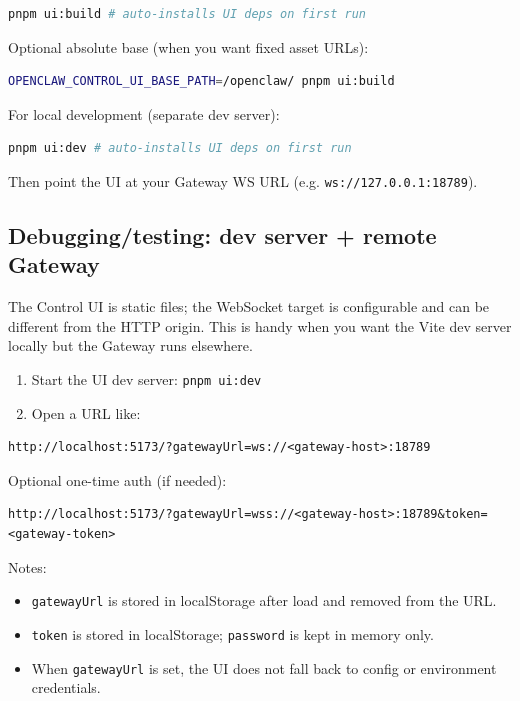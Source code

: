\begin{lstlisting}[language=bash]
pnpm ui:build # auto-installs UI deps on first run
\end{lstlisting}


Optional absolute base (when you want fixed asset URLs):

\begin{lstlisting}[language=bash]
OPENCLAW_CONTROL_UI_BASE_PATH=/openclaw/ pnpm ui:build
\end{lstlisting}


For local development (separate dev server):

\begin{lstlisting}[language=bash]
pnpm ui:dev # auto-installs UI deps on first run
\end{lstlisting}


Then point the UI at your Gateway WS URL (e.g. \texttt{ws://127.0.0.1:18789}).

\subsection{Debugging/testing: dev server + remote Gateway}


The Control UI is static files; the WebSocket target is configurable and can be
different from the HTTP origin. This is handy when you want the Vite dev server
locally but the Gateway runs elsewhere.

\begin{enumerate}
  \item Start the UI dev server: \texttt{pnpm ui:dev}
  \item Open a URL like:
\end{enumerate}


\begin{lstlisting}
http://localhost:5173/?gatewayUrl=ws://<gateway-host>:18789
\end{lstlisting}


Optional one-time auth (if needed):

\begin{lstlisting}
http://localhost:5173/?gatewayUrl=wss://<gateway-host>:18789&token=<gateway-token>
\end{lstlisting}


Notes:

\begin{itemize}
  \item \texttt{gatewayUrl} is stored in localStorage after load and removed from the URL.
  \item \texttt{token} is stored in localStorage; \texttt{password} is kept in memory only.
  \item When \texttt{gatewayUrl} is set, the UI does not fall back to config or environment credentials.
\end{itemize}

